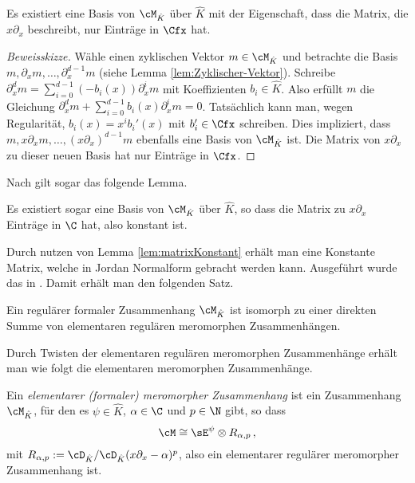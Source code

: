 \begin{lem}
Es existiert eine Basis von $\cM_{\hat K}$ über $\hat K$ mit der Eigenschaft,
dass die Matrix, die $x\partial_x$ beschreibt, nur Einträge in $\Cfx$ hat.
\end{lem}
\begin{comment}
\cite[Lem 5.2.1.]{sabbah_cimpa90}
\end{comment}
\begin{proof}[Beweisskizze] 
Wähle einen zyklischen Vektor $m\in\cM_{\hat K}$ %
und betrachte die Basis $m,\partial_x m,\dots,\partial_x^{d-1}m$ (siehe Lemma
\ref{lem:Zyklischer-Vektor}).
Schreibe $\partial_x^dm=\sum_{i=0}^{d-1}(-b_i(x))\partial_x^im$ mit
Koeffizienten $b_i\in\hat K$.
Also erfüllt $m$ die Gleichung
$\partial_x^dm+\sum_{i=0}^{d-1}b_i(x)\partial_x^im=0$.
Tatsächlich kann man, wegen Regularität, $b_i(x)=x^ib_i'(x)$ mit $b_i'\in \Cfx$
schreiben.
Dies impliziert, dass $m,x\partial_xm,\dots,(x\partial_x)^{d-1}m$ ebenfalls
eine Basis von $\cM_{\hat K}$ ist.
Die Matrix von $x\partial_x$ zu dieser neuen Basis hat nur Einträge in $\Cfx$.
\end{proof}
Nach \cite[Thm 5.2.2]{sabbah_cimpa90} gilt sogar das folgende Lemma.
\begin{lem} \label{lem:matrixKonstant}
Es existiert sogar eine Basis von $\cM_{\hat K}$ über $\hat K$, so dass die
Matrix zu $x\partial_x$ Einträge in $\C$ hat, also konstant ist.
\end{lem}

Durch nutzen von Lemma \ref{lem:matrixKonstant} erhält man eine Konstante
Matrix, welche in Jordan Normalform gebracht werden kann. 
Ausgeführt wurde das in \cite[Cor. 5.2.6]{sabbah_cimpa90}.
Damit erhält man den folgenden Satz.
\begin{thm} \label{thm:regulaerInDirSumme}
Ein regulärer formaler Zusammenhang $\cM_{\hat K}$ ist isomorph zu einer
direkten Summe von elementaren regulären meromorphen Zusammenhängen.
\end{thm}

Durch Twisten der elementaren regulären meromorphen Zusammenhänge erhält man
wie folgt die elementaren meromorphen Zusammenhänge.
\begin{defn} \label{defn:elemMerZsh}
Ein \emph{elementarer (formaler) meromorpher Zusammenhang} ist ein Zusammenhang
$\cM_{\hat K}$, für den es $\psi \in \hat K$, $\alpha\in\C$ und $p\in \N$ gibt,
so dass
\[
\cM\cong \sE^{\psi}\otimes R_{\alpha,p}\,,
\]
mit $R_{\alpha,p}:=\cD_{\hat K}/\cD_{\hat K}(x\partial_x-\alpha)^p$, also ein
elementarer regulärer meromorpher Zusammenhang ist.
\end{defn}

